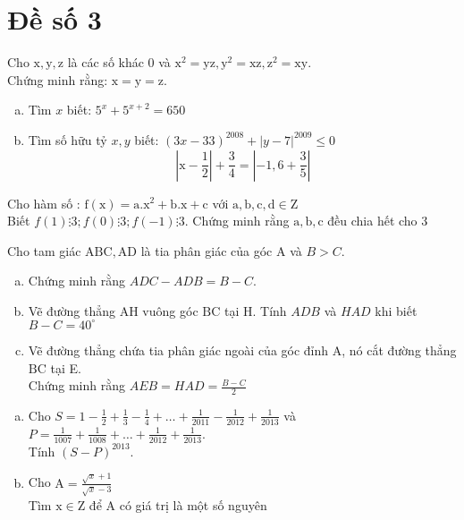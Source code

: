 \section{Đề số 3}

\begin{bt} 
    Cho $\mathrm{x}, \mathrm{y}, \mathrm{z}$ là các số khác 0 và $\mathrm{x}^2=\mathrm{yz}, \mathrm{y}^2=\mathrm{xz}, \mathrm{z}^2=\mathrm{xy}$.\\
Chứng minh rằng: $\mathrm{x}=\mathrm{y}=\mathrm{z}$.
\loigiai{} 
\end{bt}

\begin{bt}
    \begin{enumerate}[a.]
        \item Tìm $x$ biết: $5^x+5^{x+2}=650$
        \item Tìm số hữu tỷ $x, y$ biết: $(3 x-33)^{2008}+|y-7|^{2009} \leq 0$
    $$
    \left|\mathrm{x}-\frac{1}{2}\right|+\frac{3}{4}=\left|-1,6+\frac{3}{5}\right|
    $$
    \end{enumerate}
\loigiai{} 
\end{bt}

\begin{bt}
    Cho hàm số : $\mathrm{f}(\mathrm{x})=\mathrm{a} .\mathrm{x}^2+\mathrm{b} . \mathrm{x}+\mathrm{c}$ với $\mathrm{a}, \mathrm{b}, \mathrm{c}, \mathrm{d} \in \mathrm{Z}$\\
Biết $f(1) \vdots 3 ; f(0) \vdots 3 ; f(-1) \vdots 3$. Chứng minh rằng $\mathrm{a}, \mathrm{b}, \mathrm{c}$ đều chia hết cho 3
\loigiai{} 
\end{bt}

\begin{bt}
    Cho tam giác $\mathrm{ABC}, \mathrm{AD}$ là tia phân giác của góc $\mathrm{A}$ và $B>C$.
    \begin{enumerate}[a.]
    \item Chứng minh rằng $A D C-A D B=B-C$.
    \item Vẽ đường thẳng $\mathrm{AH}$ vuông góc $\mathrm{BC}$ tại $\mathrm{H}$. Tính $A D B$ và $H A D$ khi biết $B-C=40^{\circ}$
    \item Vẽ đường thẳng chứa tia phân giác ngoài của góc đỉnh $\mathrm{A}$, nó cắt đường thẳng $\mathrm{BC}$
    tại E.\\ Chứng minh rằng $A E B=H A D=\frac{B-C}{2}$
    \end{enumerate}
\loigiai{}
\end{bt}

\begin{bt}
    \begin{enumerate}[a.]
        \item  Cho $S=1-\frac{1}{2}+\frac{1}{3}-\frac{1}{4}+\ldots+\frac{1}{2011}-\frac{1}{2012}+\frac{1}{2013}$ và $P=\frac{1}{1007}+\frac{1}{1008}+\ldots+\frac{1}{2012}+\frac{1}{2013}$.\\ Tính $(S-P)^{2013}$.
        \item Cho $\mathrm{A}=\frac{\sqrt{x}+1}{\sqrt{x}-3}$\\ Tìm $\mathrm{x} \in \mathrm{Z}$ để $\mathrm{A}$ có giá trị là một số nguyên
    \end{enumerate}
\loigiai{}
\end{bt}